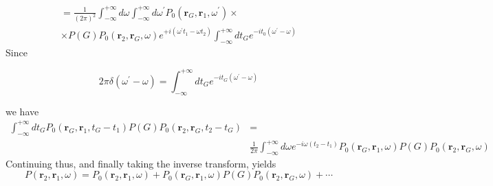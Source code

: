 $$\begin{array}{c}
=\frac{1}{(2 \pi)^{2}} \int_{-\infty}^{+\infty} d \omega \int_{-\infty}^{+\infty} d \omega^{\prime} P_{0}\left(\mathbf{r}_{G}, \mathbf{r}_{1}, \omega^{\prime}\right) \times \\
\times P(G) P_{0}\left(\mathbf{r}_{2}, \mathbf{r}_{G}, \omega\right) e^{+i\left(\omega^{\prime} t_{1}-\omega t_{2}\right)} \int_{-\infty}^{+\infty} d t_{G} e^{-i t_{0}\left(\omega^{\prime}-\omega\right)}
\end{array}$$
Since
\begin{imp}
\begin{equation}
2 \pi \delta\left(\omega^{\prime}-\omega\right)=\int_{-\infty}^{+\infty} d t_{G} e^{-i t_{G}\left(\omega^{\prime}-\omega\right)}\end{equation}
\end{imp}
we have
\begin{equation}
\begin{aligned}
\int_{-\infty}^{+\infty} d t_{G} P_{0}\left(\mathbf{r}_{G}, \mathbf{r}_{1}, t_{G}-t_{1}\right) P(G) P_{0}\left(\mathbf{r}_{2}, \mathbf{r}_{G}, t_{2}-t_{G}\right)&=\\
&\frac{1}{2 \pi} \int_{-\infty}^{+\infty} d \omega e^{-i \omega\left(t_{2}-t_{1}\right)} P_{0}\left(\mathbf{r}_{G}, \mathbf{r}_{1}, \omega\right) P(G) P_{0}\left(\mathbf{r}_{2}, \mathbf{r}_{G}, \omega\right)
\end{aligned}
\end{equation}
Continuing thus, and finally taking the inverse transform, yields
\begin{equation}P\left(\mathbf{r}_{2}, \mathbf{r}_{1}, \omega\right)=P_{0}\left(\mathbf{r}_{2}, \mathbf{r}_{1}, \omega\right)+P_{0}\left(\mathbf{r}_{G}, \mathbf{r}_{1}, \omega\right) P(G) P_{0}\left(\mathbf{r}_{2}, \mathbf{r}_{G}, \omega\right)+\cdots\end{equation}
